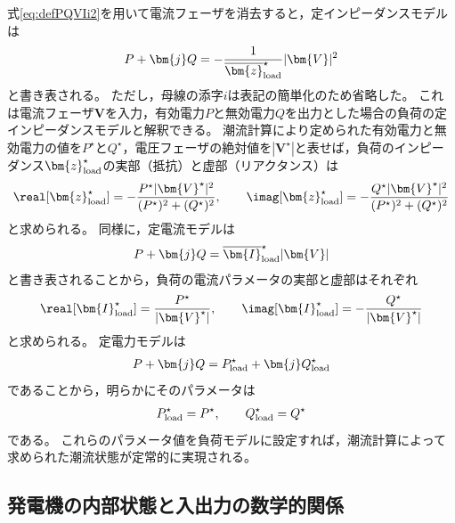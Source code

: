 \documentclass[tombow,dvipdfmx]{corona-a5-1.1}
\begin{document}
式\ref{eq:defPQVIi2}を用いて電流フェーザを消去すると，定インピーダンスモデルは
\begin{align}\label{eq:lmodimp}
P + \bm{j} Q = -\frac{1}{\overline{\bm{z}}_{\rm load}^{\star}} |\bm{V}|^2
\end{align}
と書き表される。
ただし，母線の添字$i$は表記の簡単化のため省略した。
これは電流フェーザ$\bm{V}$を入力，有効電力$P$と無効電力$Q$を出力とした場合の負荷の定インピーダンスモデルと解釈できる。
潮流計算により定められた有効電力と無効電力の値を$P^{\star}$と$Q^{\star}$，電圧フェーザの絶対値を$|\bm{V}^{\star}|$と表せば，負荷のインピーダンス$\bm{z}_{\rm load}^{\star}$の実部（抵抗）と虚部（リアクタンス）は
\begin{align}\label{eq:lmodimppara}
\real [\bm{z}_{\rm load}^{\star}] = - \frac{ P^{\star} |\bm{V}^{\star}|^2 }{(P^{\star})^2 + (Q^{\star})^2}
,\qquad
\imag [\bm{z}_{\rm load}^{\star}] = - \frac{ Q^{\star} |\bm{V}^{\star}|^2 }{(P^{\star})^2 + (Q^{\star})^2}
\end{align}
と求められる。
同様に，定電流モデルは
\begin{align}
P + \bm{j} Q = \overline{\bm{I}}_{\rm load}^{\star} |\bm{V}|
\end{align}
と書き表されることから，負荷の電流パラメータの実部と虚部はそれぞれ
\begin{align*}
\real [\bm{I}_{\rm load}^{\star}]
 =\frac{P^{\star} }{|\bm{V}^{\star}|},\qquad
\imag [\bm{I}_{\rm load}^{\star}]
 = -\frac{ Q^{\star} }{|\bm{V}^{\star}|}
\end{align*}
と求められる。
定電力モデルは
\begin{align}
P + \bm{j} Q =
P_{{\rm load}}^{\star} + \bm{j} Q_{{\rm load}}^{\star} 
\end{align}
であることから，明らかにそのパラメータは
\begin{align*}
P_{\rm load}^{\star}=P^{\star}
,\qquad
Q_{\rm load}^{\star}=Q^{\star}
\end{align*}
である。
これらのパラメータ値を負荷モデルに設定すれば，潮流計算によって求められた潮流状態が定常的に実現される。

\subsection{発電機の内部状態と入出力の数学的関係\advanced}\label{sec:genssPQ}
\end{document}

